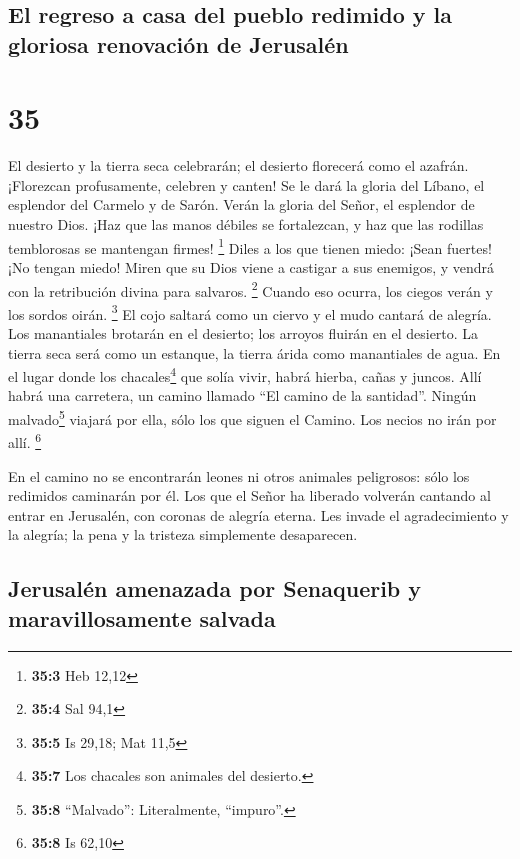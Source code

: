 \hypertarget{el-regreso-a-casa-del-pueblo-redimido-y-la-gloriosa-renovaciuxf3n-de-jerusaluxe9n}{%
\subsection{El regreso a casa del pueblo redimido y la gloriosa
renovación de
Jerusalén}\label{el-regreso-a-casa-del-pueblo-redimido-y-la-gloriosa-renovaciuxf3n-de-jerusaluxe9n}}

\hypertarget{section-34}{%
\section{35}\label{section-34}}

 El desierto y la tierra seca celebrarán; el desierto
florecerá como el azafrán.  ¡Florezcan profusamente,
celebren y canten! Se le dará la gloria del Líbano, el esplendor del
Carmelo y de Sarón. Verán la gloria del Señor, el esplendor de nuestro
Dios.  ¡Haz que las manos débiles se fortalezcan, y haz
que las rodillas temblorosas se mantengan firmes! \footnote{\textbf{35:3}
  Heb 12,12}  Diles a los que tienen miedo: ¡Sean fuertes!
¡No tengan miedo! Miren que su Dios viene a castigar a sus enemigos, y
vendrá con la retribución divina para salvaros. \footnote{\textbf{35:4}
  Sal 94,1}  Cuando eso ocurra, los ciegos verán y los
sordos oirán. \footnote{\textbf{35:5} Is 29,18; Mat 11,5} 
El cojo saltará como un ciervo y el mudo cantará de alegría. Los
manantiales brotarán en el desierto; los arroyos fluirán en el desierto.
 La tierra seca será como un estanque, la tierra árida
como manantiales de agua. En el lugar donde los chacales\footnote{\textbf{35:7}
  Los chacales son animales del desierto.} que solía vivir, habrá
hierba, cañas y juncos.  Allí habrá una carretera, un
camino llamado ``El camino de la santidad''. Ningún malvado\footnote{\textbf{35:8}
  ``Malvado'': Literalmente, ``impuro''.} viajará por ella, sólo los que
siguen el Camino. Los necios no irán por allí. \footnote{\textbf{35:8}
  Is 62,10}

 En el camino no se encontrarán leones ni otros animales
peligrosos: sólo los redimidos caminarán por él.  Los que
el Señor ha liberado volverán cantando al entrar en Jerusalén, con
coronas de alegría eterna. Les invade el agradecimiento y la alegría; la
pena y la tristeza simplemente desaparecen.

\hypertarget{jerusaluxe9n-amenazada-por-senaquerib-y-maravillosamente-salvada}{%
\subsection{Jerusalén amenazada por Senaquerib y maravillosamente
salvada}\label{jerusaluxe9n-amenazada-por-senaquerib-y-maravillosamente-salvada}}


